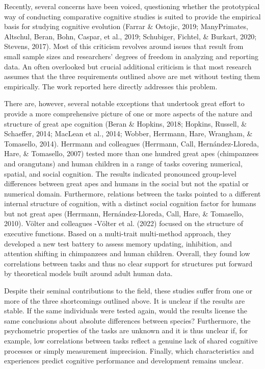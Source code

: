 \documentclass[
  man,floatsintext]{apa6}
\begin{document}
Recently, several concerns have been voiced, questioning whether the prototypical way of conducting comparative cognitive studies is suited to provide the empirical basis for studying cognitive evolution (Farrar \& Ostojic, 2019; ManyPrimates, Altschul, Beran, Bohn, Caspar, et al., 2019; Schubiger, Fichtel, \& Burkart, 2020; Stevens, 2017). Most of this criticism revolves around issues that result from small sample sizes and researchers' degrees of freedom in analyzing and reporting data. An often overlooked but crucial additional criticism is that most research assumes that the three requirements outlined above are met without testing them empirically. The work reported here directly addresses this problem.

There are, however, several notable exceptions that undertook great effort to provide a more comprehensive picture of one or more aspects of the nature and structure of great ape cognition (Beran \& Hopkins, 2018; Hopkins, Russell, \& Schaeffer, 2014; MacLean et al., 2014; Wobber, Herrmann, Hare, Wrangham, \& Tomasello, 2014). Herrmann and colleagues (Herrmann, Call, Hernández-Lloreda, Hare, \& Tomasello, 2007) tested more than one hundred great apes (chimpanzees and orangutans) and human children in a range of tasks covering numerical, spatial, and social cognition. The results indicated pronounced group-level differences between great apes and humans in the social but not the spatial or numerical domain. Furthermore, relations between the tasks pointed to a different internal structure of cognition, with a distinct social cognition factor for humans but not great apes (Herrmann, Hernández-Lloreda, Call, Hare, \& Tomasello, 2010). Völter and colleagues -Völter et al. (2022) focused on the structure of executive functions. Based on a multi-trait multi-method approach, they developed a new test battery to assess memory updating, inhibition, and attention shifting in chimpanzees and human children. Overall, they found low correlations between tasks and thus no clear support for structures put forward by theoretical models built around adult human data.

Despite their seminal contributions to the field, these studies suffer from one or more of the three shortcomings outlined above. It is unclear if the results are stable. If the same individuals were tested again, would the results license the same conclusions about absolute differences between species? Furthermore, the psychometric properties of the tasks are unknown and it is thus unclear if, for example, low correlations between tasks reflect a genuine lack of shared cognitive processes or simply measurement imprecision. Finally, which characteristics and experiences predict cognitive performance and development remains unclear.
\end{document}
